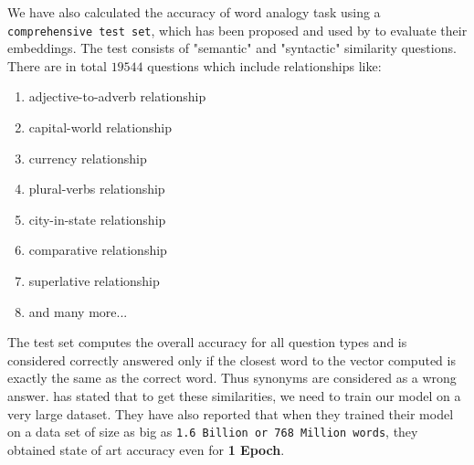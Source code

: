 We have also calculated the accuracy of word analogy task using a \texttt{comprehensive test set}, which has been proposed and used by \cite{mikolov2013efficient} to evaluate their embeddings. The test consists of "semantic" and "syntactic" similarity questions. There are in total $19544$ questions which include relationships like: 
\begin{enumerate}
	\item adjective-to-adverb relationship
	\item capital-world relationship
	\item currency relationship
	\item plural-verbs relationship
	\item city-in-state relationship
	\item comparative relationship
	\item superlative relationship
	\item and many more...
\end{enumerate}
The test set computes the overall accuracy for all question types and is considered correctly answered only if the closest word to the vector computed is exactly the same as the correct word. Thus synonyms are considered as a wrong answer. \cite{mikolov2013efficient} has stated that to get these similarities, we need to train our model on a very large dataset. They have also reported that when they trained their model on a data set of size as big as \texttt{1.6 Billion or 768 Million words}, they obtained state of art accuracy even for \textbf{1 Epoch}.\\

